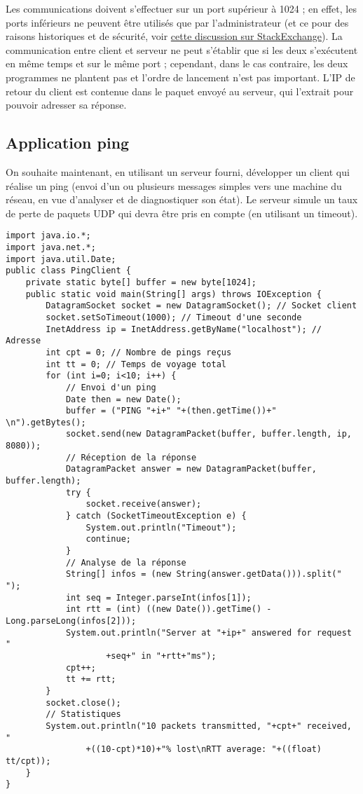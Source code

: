 \documentclass[a4paper]{article}
\begin{document}
Les communications doivent s'effectuer sur un port supérieur à 1024 ; en effet, les ports inférieurs ne peuvent être utilisés que par l'administrateur (et ce pour des raisons historiques et de sécurité, voir \href{http://unix.stackexchange.com/questions/16564/why-are-the-first-1024-ports-restricted-to-the-root-user-only}{cette discussion sur StackExchange}). La communication entre client et serveur ne peut s'établir que si les deux s'exécutent en même temps et sur le même port ; cependant, dans le cas contraire, les deux programmes ne plantent pas et l'ordre de lancement n'est pas important. L'IP de retour du client est contenue dans le paquet envoyé au serveur, qui l'extrait pour pouvoir adresser sa réponse.

\subsection{Application ping}

On souhaite maintenant, en utilisant un serveur fourni, développer un client qui réalise un ping (envoi d'un ou plusieurs messages simples vers une machine du réseau, en vue d'analyser et de diagnostiquer son état). Le serveur simule un taux de perte de paquets UDP qui devra être pris en compte (en utilisant un timeout).

\begin{lstlisting}
import java.io.*;
import java.net.*;
import java.util.Date;
public class PingClient {
    private static byte[] buffer = new byte[1024];
    public static void main(String[] args) throws IOException {
        DatagramSocket socket = new DatagramSocket(); // Socket client
        socket.setSoTimeout(1000); // Timeout d'une seconde
        InetAddress ip = InetAddress.getByName("localhost"); // Adresse
        int cpt = 0; // Nombre de pings reçus
        int tt = 0; // Temps de voyage total
        for (int i=0; i<10; i++) {
            // Envoi d'un ping
            Date then = new Date();
            buffer = ("PING "+i+" "+(then.getTime())+" \n").getBytes();
            socket.send(new DatagramPacket(buffer, buffer.length, ip, 8080));
            // Réception de la réponse
            DatagramPacket answer = new DatagramPacket(buffer, buffer.length);
            try {
                socket.receive(answer);
            } catch (SocketTimeoutException e) {
                System.out.println("Timeout");
                continue;
            }
            // Analyse de la réponse
            String[] infos = (new String(answer.getData())).split(" ");
            int seq = Integer.parseInt(infos[1]);
            int rtt = (int) ((new Date()).getTime() - Long.parseLong(infos[2]));
            System.out.println("Server at "+ip+" answered for request "
            		+seq+" in "+rtt+"ms");
            cpt++;
            tt += rtt;
        }
        socket.close();
        // Statistiques
        System.out.println("10 packets transmitted, "+cpt+" received, "
       			+((10-cpt)*10)+"% lost\nRTT average: "+((float) tt/cpt));
    }
}
\end{lstlisting}
\end{document}
